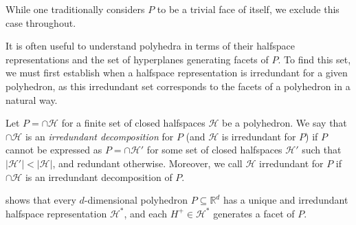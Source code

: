 \documentclass[twoside,11pt]{article}
\newcommand{\Comments}{1}
\newcommand{\mytodo}[2]{\ifnum\Comments=1%
  \todo[linecolor=#1!80!black,backgroundcolor=#1,bordercolor=#1!80!black]{#2}\fi}
\newcommand{\raft}[1]{\mytodo{green!20!white}{RF: #1}}
\newcommand{\reals}{\mathbb{R}}
\renewcommand{\H}{\mathcal{H}}
\newtheorem{claim}{Claim}
\begin{document}
While one traditionally considers $P$ to be a trivial face of itself, we exclude this case throughout.


It is often useful to understand polyhedra in terms of their halfspace representations and the set of hyperplanes generating facets of $P$.
To find this set, we must first establish when a halfspace representation is irredundant for a given polyhedron, as this irredundant set corresponds to the facets of a polyhedron in a natural way.

\begin{definition}\label{def:irredundant}
	Let $P = \cap \H$ for a finite set of closed halfspaces $\H$ be a polyhedron.
	We say that $\cap \H$ is an \emph{irredundant decomposition} for $P$ (and $\H$ is irredundant for $P$) if $P$ cannot be expressed as $P = \cap \H'$ for some set of closed halfspaces $\H'$ such that $|\H'| < |\H|$, and redundant otherwise.
	Moreover, we call $\H$ irredundant for $P$ if $\cap \H$ is an irredundant decomposition of $P$.
\end{definition}

\citet{gallier2008notes} shows that every $d$-dimensional polyhedron $P \subseteq \reals^d$ has a unique and irredundant halfspace representation $\H^*$, and each $H^+ \in \H^*$ generates a facet of $P$.
\end{document}
